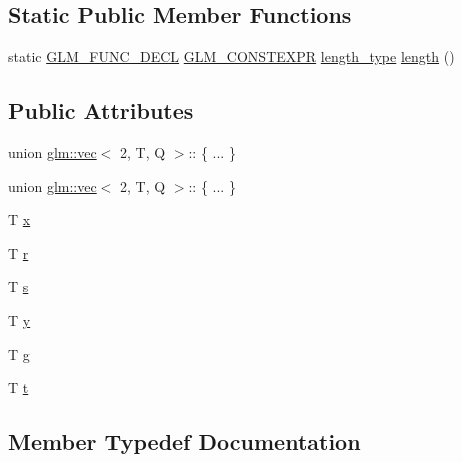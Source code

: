 \subsection*{Static Public Member Functions}
\begin{DoxyCompactItemize}
\item 
static \hyperlink{setup_8hpp_ab2d052de21a70539923e9bcbf6e83a51}{G\+L\+M\+\_\+\+F\+U\+N\+C\+\_\+\+D\+E\+CL} \hyperlink{setup_8hpp_a08b807947b47031d3a511f03f89645ad}{G\+L\+M\+\_\+\+C\+O\+N\+S\+T\+E\+X\+PR} \hyperlink{structglm_1_1vec_3_012_00_01_t_00_01_q_01_4_af8b652526ec88c8513b2a8c05bf92441}{length\+\_\+type} \hyperlink{structglm_1_1vec_3_012_00_01_t_00_01_q_01_4_a93fee4eb07a69842caff0d41acf83ddd}{length} ()
\end{DoxyCompactItemize}
\subsection*{Public Attributes}
\begin{DoxyCompactItemize}
\item 
union \hyperlink{structglm_1_1vec}{glm\+::vec}$<$ 2, T, Q $>$\+:: \{ ... \}  
\item 
union \hyperlink{structglm_1_1vec}{glm\+::vec}$<$ 2, T, Q $>$\+:: \{ ... \}  
\item 
T \hyperlink{structglm_1_1vec_3_012_00_01_t_00_01_q_01_4_a49302c697fe0183c08329f51cdf70894}{x}
\item 
T \hyperlink{structglm_1_1vec_3_012_00_01_t_00_01_q_01_4_a8a13d65214d1106eb2e6c9ce472b99d3}{r}
\item 
T \hyperlink{structglm_1_1vec_3_012_00_01_t_00_01_q_01_4_a8d48d79792a1a615db48fb825512f5a6}{s}
\item 
T \hyperlink{structglm_1_1vec_3_012_00_01_t_00_01_q_01_4_ad674beb9a1e35fe0390507911daad747}{y}
\item 
T \hyperlink{structglm_1_1vec_3_012_00_01_t_00_01_q_01_4_aaf3f27aace8dfa7faee4c496738852b4}{g}
\item 
T \hyperlink{structglm_1_1vec_3_012_00_01_t_00_01_q_01_4_a5bf8dc6f825eb9798f810fd7135b5777}{t}
\end{DoxyCompactItemize}


\subsection{Member Typedef Documentation}
\mbox{\label{structglm_1_1vec_3_012_00_01_t_00_01_q_01_4_a69145b83aafbff09d5d187089564c46f}} 
